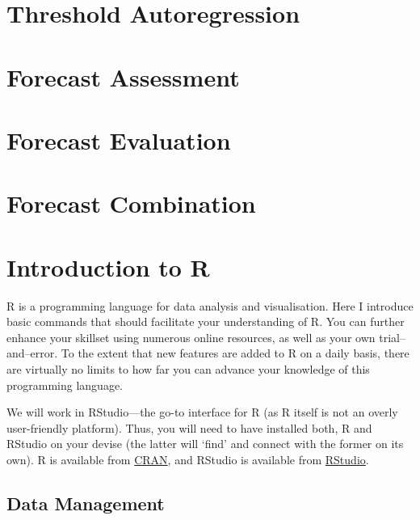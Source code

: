 \documentclass[
  oneside]{book}
\begin{document}
\hypertarget{threshold-autoregression}{%
\chapter{Threshold Autoregression}\label{threshold-autoregression}}

\hypertarget{forecast-assessment}{%
\chapter*{Forecast Assessment}\label{forecast-assessment}}

\hypertarget{forecast-evaluation}{%
\chapter{Forecast Evaluation}\label{forecast-evaluation}}

\hypertarget{forecast-combination}{%
\chapter{Forecast Combination}\label{forecast-combination}}

\hypertarget{introduction-to-r}{%
\chapter*{Introduction to R}\label{introduction-to-r}}

R is a programming language for data analysis and visualisation. Here I introduce basic commands that should facilitate your understanding of R. You can further enhance your skillset using numerous online resources, as well as your own trial--and--error. To the extent that new features are added to R on a daily basis, there are virtually no limits to how far you can advance your knowledge of this programming language.

We will work in RStudio---the go-to interface for R (as R itself is not an overly user-friendly platform). Thus, you will need to have installed both, R and RStudio on your devise (the latter will `find' and connect with the former on its own). R is available from \href{https://cran.r-project.org/}{CRAN}, and RStudio is available from \href{https://www.rstudio.com/}{RStudio}.

\hypertarget{data-management}{%
\section*{Data Management}\label{data-management}}
\end{document}
